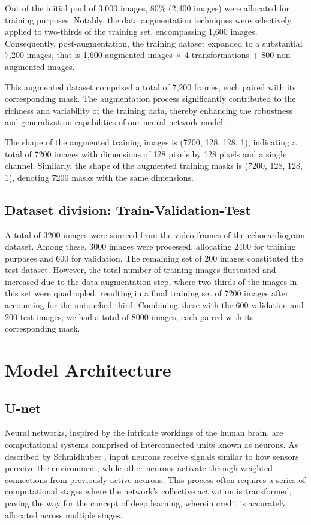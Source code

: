 \documentclass[runningheads]{llncs}
\begin{document}
Out of the initial pool of 3,000 images, 80\% (2,400 images) were allocated for training purposes. Notably, the data augmentation techniques were selectively applied to two-thirds of the training set, encompassing 1,600 images. Consequently, post-augmentation, the training dataset expanded to a substantial 7,200 images, that is 1,600 augmented images $\times$
 4 transformations $+$ 800 non-augmented images.
 
This augmented dataset comprised a total of 7,200 frames, each paired with its corresponding mask. The augmentation process significantly contributed to the richness and variability of the training data, thereby enhancing the robustness and generalization capabilities of our neural network model. 

The shape of the augmented training images is (7200, 128, 128, 1), indicating a total of 7200 images with dimensions of 128 pixels by 128 pixels and a single channel. Similarly, the shape of the augmented training masks is (7200, 128, 128, 1), denoting 7200 masks with the same dimensions.

\subsection{Dataset division: Train-Validation-Test}
A total of 3200 images were sourced from the video frames of the echocardiogram dataset. Among these, 3000 images were processed, allocating 2400 for training purposes and 600 for validation. The remaining set of 200 images constituted the test dataset. However, the total number of training images fluctuated and increased due to the data augmentation step, where two-thirds of the images in this set were quadrupled, resulting in a final training set of 7200 images after accounting for the untouched third. Combining these with the 600 validation and 200 test images, we had a total of 8000 images, each paired with its corresponding mask.

\section{Model Architecture}
\subsection{U-net}
Neural networks, inspired by the intricate workings of the human brain, are computational systems comprised of interconnected units known as neurons. As described by Schmidhuber \cite{nn}, input neurons receive signals similar to how sensors perceive the environment, while other neurons activate through weighted connections from previously active neurons. This process often requires a series of computational stages where the network's collective activation is transformed, paving the way for the concept of deep learning, wherein credit is accurately allocated across multiple stages.
\end{document}
